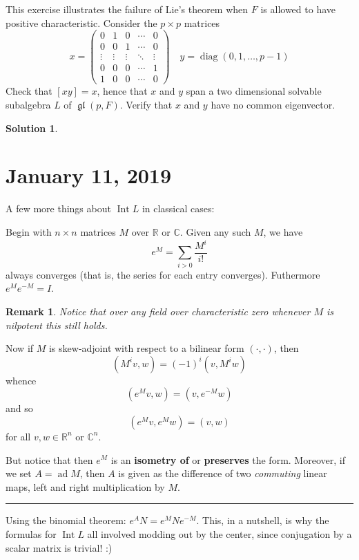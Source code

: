 \documentclass[12pt]{article}
\newenvironment{hwprob}[1]
{\renewcommand{\theprob}{#1}%
 \addtocounter{thm}{-1}%
 \begin{prob}}
{\end{prob}}
\theoremstyle{nonumberbreak}
\newtheorem{sol}{Solution}
\theoremstyle{changebreak}
\theoremstyle{nonumberbreak}
\theoremstyle{change}
\newtheorem{rmk}[thm]{Remark}
\newcommand*{\R}{
\mathbb{R}
}
\newcommand*{\C}{
\mathbb{C}
}
\newcommand*{\brk}{
\rule{2in}{.1pt}
}
\DeclareMathOperator{\gl}{\mathfrak{gl}}
\DeclareMathOperator{\ad}{ad}
\DeclareMathOperator{\Int}{Int}
\DeclareMathOperator{\diag}{diag}
\begin{document}
\begin{hwprob}{4.3}
	This exercise illustrates the failure of Lie's theorem when $F$ is allowed to have positive characteristic.
	Consider the $p\times p$ matrices
	\[x=\begin{pmatrix}
		0 & 1 & 0 & \cdots & 0\\
		0 & 0 & 1 & \cdots & 0\\
		\vdots & \vdots & \vdots & \ddots & \vdots\\
		0 & 0 & 0 & \cdots & 1\\
		1 & 0 & 0 & \cdots & 0
	\end{pmatrix}\quad y=\diag(0,1,\dots, p-1)\]
	Check that $[xy]=x$, hence that $x$ and $y$ span a two dimensional solvable subalgebra $L$ of $\gl(p,F)$. Verify that $x$ and $y$ have no common eigenvector.
\end{hwprob}
\begin{sol}

\end{sol}
\newpage

\section{January 11, 2019}
A few more things about $\Int L$ in classical cases:

Begin with $n\times n$ matrices $M$ over $\R$ or $\C$. Given any such $M$, we have
\[e^M=\sum_{i>0}\frac{M^i}{i!}\]
always converges (that is, the series for each entry converges). Futhermore $e^Me^{-M}=I$.
\begin{rmk}
	Notice that over \textit{any} field over characteristic zero whenever $M$ is nilpotent 
	this still holds.
\end{rmk}

Now if $M$ is skew-adjoint with respect to a bilinear form $(\cdot,\cdot)$, then 
\[(M^iv,w)=(-1)^i(v,M^iw)\]
whence
\[(e^Mv, w)=(v,e^{-M}w)\]
and so 
\[(e^Mv,e^Mw)=(v,w)\]
for all $v,w\in\R^n$ or $\C^n$.

But notice that then $e^M$ is an \textbf{isometry of} or \textbf{preserves} the form. Moreover, 
if we set $A=\ad M$, then $A$ is given as the difference of two \textit{commuting} linear maps, 
left and right multiplication by $M$.

\brk

Using the binomial theorem: $e^AN=e^MNe^{-M}$. This, in a nutshell, is why the formulas for
$\Int L$ all involved modding out by the center, since conjugation by a scalar matrix is trivial! :)
\end{document}
